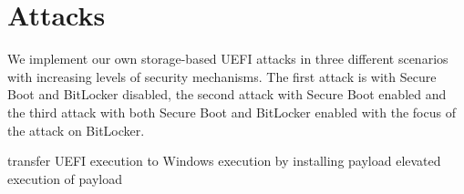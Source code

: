
\chapter{Attacks}

We implement our own storage-based \ac{UEFI} attacks in three different scenarios with increasing levels of security mechanisms. The first attack is with Secure Boot and BitLocker disabled, the second attack with Secure Boot enabled and the third attack with both Secure Boot and BitLocker enabled with the focus of the attack on BitLocker.

transfer UEFI execution to Windows execution by installing payload
elevated execution of payload



